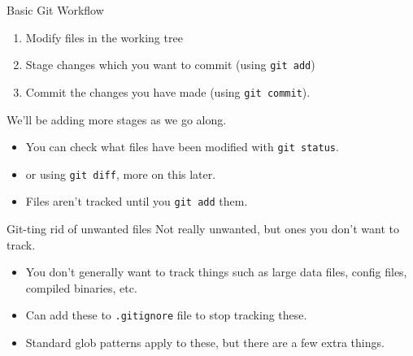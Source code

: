 \documentclass{beamer}
\begin{document}
\begin{frame}{Basic Git Workflow}
    \begin{enumerate}
        \item Modify files in the working tree
        \item Stage changes which you want to commit (using \texttt{git add})
        \item Commit the changes you have made (using \texttt{git commit}).
    \end{enumerate}
    We'll be adding more stages as we go along. 
    \begin{itemize}
        \item You can check what files have been modified with \texttt{git status}.
        \item or using \texttt{git diff}, more on this later.
        \item Files aren't tracked until you \texttt{git add} them.
    \end{itemize}
\end{frame}

\begin{frame}{Git-ting rid of unwanted files}
    Not really unwanted, but ones you don't want to track.
    \begin{itemize}
        \item You don't generally want to track things such as large data files, config files, compiled binaries, etc.
        \item Can add these to \texttt{.gitignore} file to stop tracking these.
        \item Standard glob patterns apply to these, but there are a few extra things.
    \end{itemize}
\end{frame}
\end{document}
